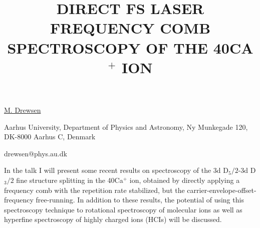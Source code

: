 \title{DIRECT FS LASER FREQUENCY COMB SPECTROSCOPY OF THE 40CA$^+$ ION}

\underline{M. Drewsen} 

{\normalsize{\vspace{-4mm}
Aarhus University,
Department of Physics and Astronomy,
Ny Munkegade 120,
DK-8000 Aarhus C,
Denmark

\email drewsen@phys.au.dk}}

In the talk I will present some recent results on spectroscopy of the 3d D$_5/2$-3d D$_3/2$ fine structure splitting in the 40Ca$^+$ ion, obtained by directly applying a frequency comb with the repetition rate stabilized, but the carrier-envelope-offset-frequency free-running. In addition to these results, the potential of using this spectroscopy technique to rotational spectroscopy of molecular ions as well as hyperfine spectroscopy of highly charged ions (HCIs) will be discussed.

%
%



\vspace{\baselineskip} 